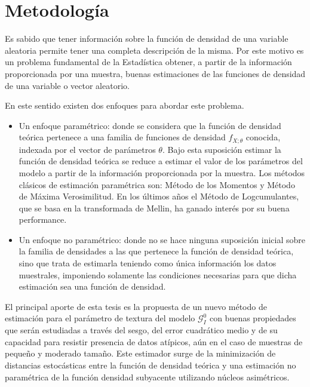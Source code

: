 
\chapter{Metodología}
\label{metodologia}

Es sabido que tener información sobre la función de densidad de una variable aleatoria permite tener una completa descripción de la misma. Por este motivo es un problema fundamental de la Estadística obtener, a partir de la información proporcionada por una muestra,  buenas estimaciones de las funciones de densidad de una variable o vector aleatorio. 

En este sentido existen dos enfoques para abordar este problema. 

\begin{itemize}
	\item Un enfoque paramétrico: donde se considera que la función de densidad teórica pertenece a una familia de funciones de densidad $f_{X;\theta}$ conocida, indexada por el vector de parámetros $\theta$. Bajo esta suposición estimar la función de densidad teórica se reduce a estimar el valor de los parámetros del modelo a partir de la información proporcionada por la muestra. Los métodos clásicos de estimación paramétrica son: Método de los Momentos y Método de Máxima Verosimilitud. En los últimos años el Método de Logcumulantes, que se basa en la transformada de Mellin, ha ganado interés por su buena performance.
	\item Un enfoque no paramétrico: donde no se hace ninguna suposición inicial sobre la familia de densidades a las que pertenece la función de densidad teórica, sino que trata de estimarla teniendo como única información los datos muestrales, imponiendo  solamente las condiciones necesarias para que dicha estimación sea una función de densidad.
\end{itemize}

El principal aporte de esta tesis es la propuesta de un nuevo método de estimación para el parámetro de textura del modelo $\mathcal G_I^0$ con buenas propiedades que serán estudiadas a través del sesgo, del error cuadrático medio y de su capacidad para resistir presencia de datos atípicos, aún en el caso de muestras de pequeño y moderado tamaño. Este estimador surge de la minimización de distancias estocásticas entre la función de densidad teórica y una estimación no paramétrica de la función densidad subyacente utilizando núcleos asimétricos. 

